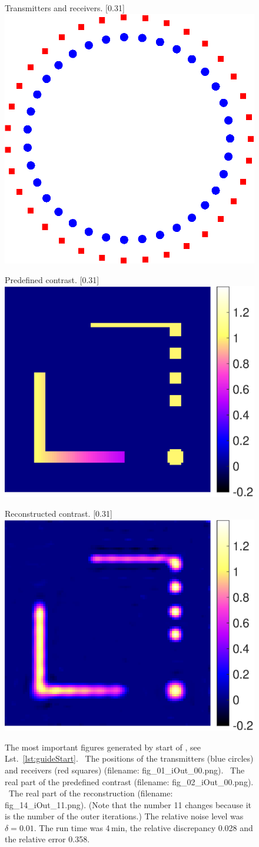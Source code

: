\documentclass[a4paper]{article}
\begin{document}
\begin{figure}
\centering
\begin{subcaptionbox}{Transmitters and receivers.
  \label{fig:convenience:transRecei}}[0.31\textwidth]{
  \includegraphics[height=0.22\textwidth]{figs/fig_exampleMod_01_iOut_00}
  }
\end{subcaptionbox}
\begin{subcaptionbox}{Predefined contrast.
  \label{fig:convenience:predefined}}[0.31\textwidth]{
  \includegraphics[height=0.22\textwidth]{figs/fig_exampleMod_02_iOut_00}
  }
\end{subcaptionbox}
\begin{subcaptionbox}{Reconstructed contrast.
  \label{fig:convenience:recon}}[0.31\textwidth]{
  \includegraphics[height=0.22\textwidth]{figs/fig_exampleMod_14_iOut_11}
  }
\end{subcaptionbox}
\caption{The most important figures generated by \textsf{start} of \IPscatt, see Lst.~\ref{lst:guideStart}. 
~The positions of the transmitters (blue circles) and receivers (red squares) (filename: \textsf{fig\_01\_iOut\_00.png}). 
~The real part of the predefined contrast (filename: \textsf{fig\_02\_iOut\_00.png}). 
~The real part of the reconstruction (filename: \textsf{fig\_14\_iOut\_11.png}). (Note that the number \textsf{11} changes because it is the number of the outer iterations.) The relative noise level was $\delta = 0.01$. The run time was 4\,min, the relative discrepancy 0.028 and the relative error 0.358.}
\label{fig:guide:convenience}
\end{figure}
\end{document}
